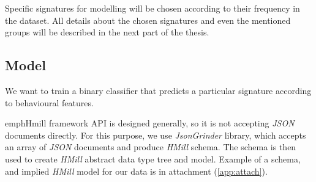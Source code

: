 Specific signatures for modelling will be chosen according to their frequency in the dataset. All details about the chosen signatures and even the mentioned groups will be described in the next part of the thesis.

\subsection{Model}
We want to train a binary classifier that predicts a particular signature according to behavioural features.

emph{Hmill} framework API is designed generally, so it is not accepting \emph{JSON} documents directly. For this purpose, we use \emph{JsonGrinder} library, which accepts an array of \emph{JSON} documents and produce \emph{HMill} schema. The schema is then used to create \emph{HMill} abstract data type tree and model. Example of a schema, and implied \emph{HMill} model for our data is in attachment (\ref{app:attach}).







